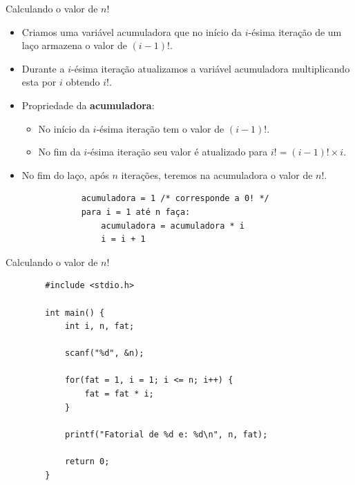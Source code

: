\documentclass[handout]{beamer}
\begin{document}
\begin{frame}[fragile]{Calculando o valor de $n!$}

    \begin{itemize}[<+->]
        \item Criamos uma variável acumuladora que no início da $i$-ésima iteração de um laço armazena o valor de $(i-1)!$.
        \item Durante a $i$-ésima iteração atualizamos a variável acumuladora multiplicando esta por $i$ obtendo $i!$.
        \item Propriedade da {\bf acumuladora}:
            \begin{itemize}
                \item No início da $i$-ésima iteração tem o valor de $(i-1)!$.
                \item No fim  da $i$-ésima iteração seu valor é atualizado para $i! = (i-1)! \times i$.
            \end{itemize}
        \item No fim do laço, após $n$ iterações, teremos na acumuladora o valor de $n!$.

        \begin{verbatim}
            acumuladora = 1 /* corresponde a 0! */
            para i = 1 até n faça:
                acumuladora = acumuladora * i
                i = i + 1
        \end{verbatim}
    \end{itemize}
\end{frame}

\begin{frame}[fragile]{Calculando o valor de $n!$}

    \begin{verbatim}
        #include <stdio.h>

        int main() {
            int i, n, fat;

            scanf("%d", &n);

            for(fat = 1, i = 1; i <= n; i++) {
                fat = fat * i;
            }

            printf("Fatorial de %d e: %d\n", n, fat);

            return 0;
        }
    \end{verbatim}
\end{frame}
\end{document}
